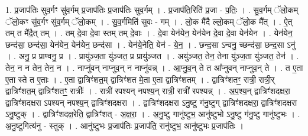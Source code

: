 \documentclass[17pt]{extarticle}
\begin{document}
1. प्र॒जाप॑तिः सुव॒र्गꣳ सु॑व॒र्गम् प्र॒जाप॑तिः प्र॒जाप॑तिः सुव॒र्गम् । . प्र॒जाप॑ति॒रिति॑ प्र॒जा - प॒तिः॒ । . सु॒व॒र्गम् ॅलो॒कम् ॅलो॒कꣳ सु॑व॒र्गꣳ सु॑व॒र्गम् ॅलो॒कम् । . सु॒व॒र्गमिति॑ सुवः - गम् । . लो॒क मै॑दै ल्लो॒कम् ॅलो॒क मै᳚त् । . ऐ॒त् तम् त मै॑दै॒त् तम् । . तम् दे॒वा दे॒वा स्तम् तम् दे॒वाः । . दे॒वा येन॑येन॒ येन॑येन दे॒वा दे॒वा येन॑येन । . येन॑येन॒ छन्द॑सा॒ छन्द॑सा॒ येन॑येन॒ येन॑येन॒ छन्द॑सा । . येन॑ये॒नेति॒ येन॑ - ये॒न॒ । . छन्द॒सा ऽन्वनु॒ च्छन्द॑सा॒ छन्द॒सा ऽनु॑ । . अनु॒ प्र प्राण्वनु॒ प्र । . प्रायु॑ञ्ज॒ता यु॑ञ्जत॒ प्र प्रायु॑ञ्जत । . अयु॑ञ्जत॒ तेन॒ तेना यु॑ञ्ज॒ता यु॑ञ्जत॒ तेन॑ । . तेन॒ न न तेन॒ तेन॒ न । . नाप्नु॑वन् नाप्नुव॒न् न नाप्नु॑वन्न् । . आ॒प्नु॒व॒न् ते त आ᳚प्नुवन् नाप्नुव॒न् ते । . त ए॒ता ए॒ता स्ते त ए॒ताः । . ए॒ता द्वात्रिꣳ॑शत॒म् द्वात्रिꣳ॑शत मे॒ता ए॒ता द्वात्रिꣳ॑शतम् । . द्वात्रिꣳ॑शतꣳ॒॒ रात्री॒ रात्री॒र् द्वात्रिꣳ॑शत॒म् द्वात्रिꣳ॑शतꣳ॒॒ रात्रीः᳚ । . रात्री॑ रपश्यन् नपश्य॒न् रात्री॒ रात्री॑ रपश्यन्न् । . अ॒प॒श्य॒न् द्वात्रिꣳ॑शदक्षरा॒ द्वात्रिꣳ॑शदक्षरा ऽपश्यन् नपश्य॒न् द्वात्रिꣳ॑शदक्षरा । . द्वात्रिꣳ॑शदक्षरा ऽनु॒ष्टु ग॑नु॒ष्टुग् द्वात्रिꣳ॑शदक्षरा॒ द्वात्रिꣳ॑शदक्षरा ऽनु॒ष्टुक् । . द्वात्रिꣳ॑शदक्ष॒रेति॒ द्वात्रिꣳ॑शत् - अ॒क्ष॒रा॒ । . अ॒नु॒ष्टु गानु॑ष्टुभ॒ आनु॑ष्टुभो ऽनु॒ष्टु ग॑नु॒ष्टु गानु॑ष्टुभः । . अ॒नु॒ष्टुगित्य॑नु - स्तुक् । . आनु॑ष्टुभः प्र॒जाप॑तिः प्र॒जाप॑ति॒ रानु॑ष्टुभ॒ आनु॑ष्टुभः प्र॒जाप॑तिः । \newline
\end{document}
